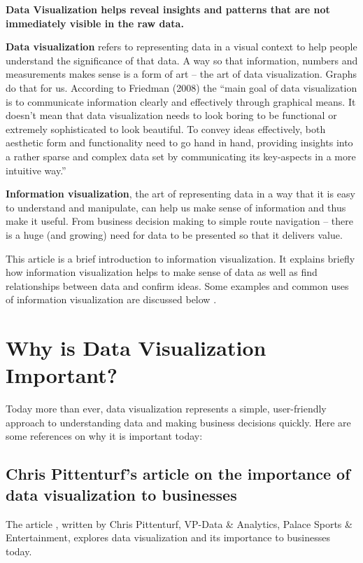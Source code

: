 \documentclass[]{book}
\theoremstyle{definition}
\theoremstyle{definition}
\theoremstyle{definition}
\theoremstyle{remark}
\begin{document}
\textbf{Data Visualization helps reveal insights and patterns that are
not immediately visible in the raw data.}

\textbf{Data visualization} refers to representing data in a visual
context to help people understand the significance of that data. A way
so that information, numbers and measurements makes sense is a form of
art -- the art of data visualization. Graphs do that for us. According
to Friedman (2008) \citep{viz} the ``main goal of data visualization is
to communicate information clearly and effectively through graphical
means. It doesn't mean that data visualization needs to look boring to
be functional or extremely sophisticated to look beautiful. To convey
ideas effectively, both aesthetic form and functionality need to go hand
in hand, providing insights into a rather sparse and complex data set by
communicating its key-aspects in a more intuitive way.''

\textbf{Information visualization}, the art of representing data in a
way that it is easy to understand and manipulate, can help us make sense
of information and thus make it useful. From business decision making to
simple route navigation -- there is a huge (and growing) need for data
to be presented so that it delivers value.

This article is a brief introduction to information visualization. It
explains briefly how information visualization helps to make sense of
data as well as find relationships between data and confirm ideas. Some
examples and common uses of information visualization are discussed
below \citep{info_viz}.

\section{Why is Data Visualization
Important?}\label{why-is-data-visualization-important}

Today more than ever, data visualization represents a simple,
user-friendly approach to understanding data and making business
decisions quickly. Here are some references on why it is important
today:

\subsection{Chris Pittenturf's article on the importance of data
visualization to
businesses}\label{chris-pittenturfs-article-on-the-importance-of-data-visualization-to-businesses}

The article \citep{viz_importance}, written by Chris Pittenturf, VP-Data
\& Analytics, Palace Sports \& Entertainment, explores data
visualization and its importance to businesses today.
\end{document}
